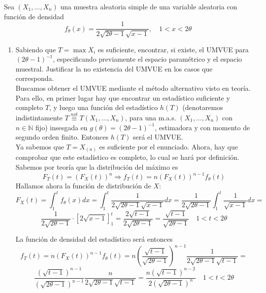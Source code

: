 \documentclass[12pt]{article}
\newcommand{\N}{\mathbb{N}}
\begin{document}
    \begin{ejercicio}[2,25 puntos]
        Sea $(X_1,\dots,X_n)$ una muestra aleatoria simple de una variable aleatoria con función
        de densidad $$f_\theta(x)=\dfrac{1}{2\sqrt{2\theta-1}\sqrt{x-1}}, \quad 1<x<2\theta$$

        \begin{enumerate}
            \item[a)] Sabiendo que $T=\max X_i$ es suficiente, encontrar, si existe, el UMVUE para
            $(2\theta-1)^{-1}$, especificando previamente el espacio paramétrico y el espacio
            muestral. Justificar la no existencia del UMVUE en los casos que corresponda. \\

            Buscamos obtener el UMVUE mediante el método alternativo visto en teoría. Para ello, en primer lugar hay que encontrar un estadístico suficiente y completo $T$, y luego una función del estadístico $h(T)$
            (denotaremos indistintamente $T \stackrel{not}{\equiv} T(X_1, \ldots, X_n)$, para una m.a.s. $(X_1, \ldots, X_n)$ con $n \in \N$ fijo) insesgada en $g(\theta) = (2\theta-1)^{-1}$, estimadora y con momento de segundo orden finito. Entonces $h(T)$ será el UMVUE. \\

            Ya sabemos que $T = X_{(n)}$ es suficiente por el enunciado. Ahora, hay que comprobar que este estadístico es completo, 
            lo cual se hará por definición. Sabemos por teoría que la distribución del máximo es 
            $$F_T(t) = (F_X(t))^n \Longrightarrow f_T(t) = n(F_X(t))^{n-1} f_\theta(t)$$
            Hallamos ahora la función de distribución de $X$:
            $$F_X(t) = \int_{1}^{t} f_\theta(x) dx = \int_{1}^{t} \dfrac{1}{2\sqrt{2\theta-1}\sqrt{x-1}} dx = \dfrac{1}{2 \sqrt{2 \theta-1}} \int_{1}^{t} \frac{1}{\sqrt{x-1}} dx = $$
            $$\dfrac{1}{2 \sqrt{2 \theta-1}} \cdot \left[2 \sqrt{x-1} \right]_{1}^{t} = \dfrac{2 \sqrt{t-1}}{2 \sqrt{2 \theta-1}} = \dfrac{\sqrt{t-1}}{\sqrt{2 \theta-1}} \quad 1 < t < 2 \theta$$

            La función de densidad del estadístico será entonces
            $$f_T(t) = n(F_X(t))^{n-1} f_\theta(t) = n \left(\dfrac{\sqrt{t-1}}{\sqrt{2 \theta-1}}\right)^{n-1} \dfrac{1}{2\sqrt{2\theta-1}\sqrt{t-1}} = $$
            $$\dfrac{(\sqrt{t-1})^{n-1}}{(\sqrt{2\theta-1})^{n-1}} \frac{n}{2\sqrt{2\theta-1}\sqrt{t-1}} = \dfrac{n(\sqrt{t-1})^{n-2}}{2(\sqrt{2\theta-1})^{n}} \quad 1 < t < 2 \theta$$


\end{enumerate}
\end{ejercicio}
\end{document}
